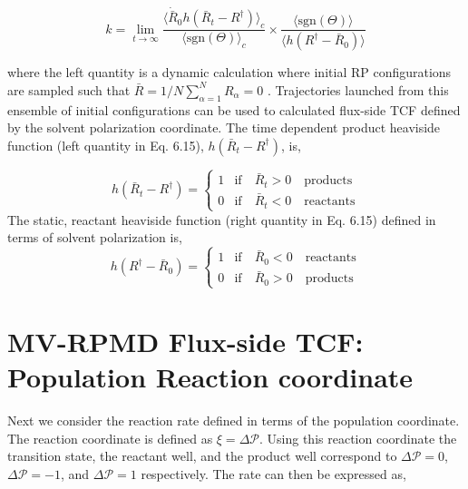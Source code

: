 \documentclass[phd,tocprelim]{cornell}
\begin{document}
\begin{equation}
 k=\lim_{t \to \infty}\frac{\langle \dot{\bar{R}}_0 h(\bar{R}_t -R^{\dagger}) \rangle_c}{\langle \textrm{sgn}(\Theta)\rangle_c} \times \frac{\langle \textrm{sgn}(\Theta)\rangle}{\langle h(R^{\dagger} -\bar{R}_0)\rangle} 
\end{equation}

where the left quantity is a dynamic calculation where initial RP configurations are sampled such that $\bar{R} = 1/N\sum_{\alpha=1}^{N} R_{\alpha}=0$ . Trajectories launched from this ensemble of initial configurations can be used to calculated flux-side TCF  defined by the solvent polarization coordinate. The time dependent product heaviside function (left quantity in Eq. 6.15),  $h(\bar{R}_t -R^{\dagger})$,  is, 

\begin{equation}
  h(\bar{R}_t -R^{\dagger})=\left\{
     \begin{array}{ll}
     1 & \textrm{if} \quad \bar{R}_t>0 \quad \textrm{products}\\
     0 &  \textrm{if} \quad  \bar{R}_t<0 \quad \textrm{reactants}
    \end{array}\right.
    \label{eq:hs}
\end{equation}
The static, reactant heaviside function (right quantity in Eq. 6.15) defined in terms of solvent polarization is, 
\begin{equation}
h(R^{\dagger} -\bar{R}_0)=\left\{
     \begin{array}{ll}
     1 & \textrm{if} \quad \bar{R}_0<0 \quad \textrm{reactants}\\
     0 &  \textrm{if} \quad  \bar{R}_0>0 \quad \textrm{products}
    \end{array}\right.
    \label{eq:hs}
\end{equation}


\section{MV-RPMD Flux-side TCF: Population Reaction coordinate}
Next we consider the reaction rate defined in terms of the population coordinate. The reaction coordinate  is defined as $\xi = \Delta \mathcal{P}$. Using this reaction coordinate the transition state, the reactant well, and the product well correspond to $\Delta \mathcal{P}=0$, $\Delta \mathcal{P}=-1$, and $\Delta \mathcal{P}=1$ respectively. The rate can then be expressed as,
\end{document}
